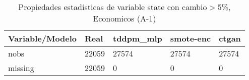 \begin{table}[H]
\centering
\fontsize{8}{14}\selectfont
\caption{Propiedades estadisticas de variable state con cambio\ensuremath{>}5\%, Economicos (A-1)}
\label{table-stats-economicos-a-1-state-short}
\begin{tabular}{|l|m{10em}|m{10em}|m{10em}|m{10em}|}
\hline
 \rowcolor[gray]{0.8}
Variable/Modelo & Real & tddpm\_mlp & smote-enc & ctgan \\
\hline nobs & 22059 & 27574 & 27574 & 27574 \\
\hline missing & 22059 & 0 & 0 & 0 \\
\hline
\end{tabular}
\end{table}
